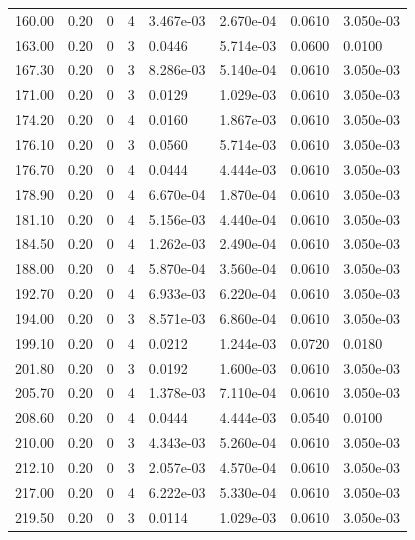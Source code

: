 \documentclass[preview]{standalone}
\begin{document}
{{{\begin{tabular}{L{1.2cm}C{1.2cm} C{0.3cm}C{0.5cm} C{1.4cm}C{1.4cm} C{1.4cm}C{1.4cm}}
  160.00  &  0.20  & 0     &  4 &  3.467e-03  & 2.670e-04  & 0.0610 &  3.050e-03   \\ 
  163.00  &  0.20  & 0     &  3 &  0.0446  & 5.714e-03  & 0.0600 &  0.0100   \\ 
  167.30  &  0.20  & 0     &  3 &  8.286e-03  & 5.140e-04  & 0.0610 &  3.050e-03   \\ 
  171.00  &  0.20  & 0     &  3 &  0.0129  & 1.029e-03  & 0.0610 &  3.050e-03   \\ 
  174.20  &  0.20  & 0     &  4 &  0.0160  & 1.867e-03  & 0.0610 &  3.050e-03   \\ 
  176.10  &  0.20  & 0     &  3 &  0.0560  & 5.714e-03  & 0.0610 &  3.050e-03   \\ 
  176.70  &  0.20  & 0     &  4 &  0.0444  & 4.444e-03  & 0.0610 &  3.050e-03   \\ 
  178.90  &  0.20  & 0     &  4 &  6.670e-04  & 1.870e-04  & 0.0610 &  3.050e-03   \\ 
  181.10  &  0.20  & 0     &  4 &  5.156e-03  & 4.440e-04  & 0.0610 &  3.050e-03   \\ 
  184.50  &  0.20  & 0     &  4 &  1.262e-03  & 2.490e-04  & 0.0610 &  3.050e-03   \\ 
  188.00  &  0.20  & 0     &  4 &  5.870e-04  & 3.560e-04  & 0.0610 &  3.050e-03   \\ 
  192.70  &  0.20  & 0     &  4 &  6.933e-03  & 6.220e-04  & 0.0610 &  3.050e-03   \\ 
  194.00  &  0.20  & 0     &  3 &  8.571e-03  & 6.860e-04  & 0.0610 &  3.050e-03   \\ 
  199.10  &  0.20  & 0     &  4 &  0.0212  & 1.244e-03  & 0.0720 &  0.0180   \\ 
  201.80  &  0.20  & 0     &  3 &  0.0192  & 1.600e-03  & 0.0610 &  3.050e-03   \\ 
  205.70  &  0.20  & 0     &  4 &  1.378e-03  & 7.110e-04  & 0.0610 &  3.050e-03   \\ 
  208.60  &  0.20  & 0     &  4 &  0.0444  & 4.444e-03  & 0.0540 &  0.0100   \\ 
  210.00  &  0.20  & 0     &  3 &  4.343e-03  & 5.260e-04  & 0.0610 &  3.050e-03   \\ 
  212.10  &  0.20  & 0     &  3 &  2.057e-03  & 4.570e-04  & 0.0610 &  3.050e-03   \\ 
  217.00  &  0.20  & 0     &  4 &  6.222e-03  & 5.330e-04  & 0.0610 &  3.050e-03   \\ 
  219.50  &  0.20  & 0     &  3 &  0.0114  & 1.029e-03  & 0.0610 &  3.050e-03   \\ 

\end{tabular}}}}
\end{document}
